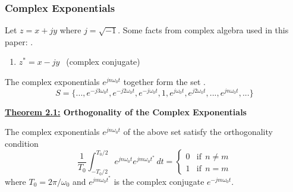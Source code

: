 \documentclass[10pt]{article}
\begin{document}
\subsubsection{Complex Exponentials}
Let $z = x + jy$ where $j = \sqrt{-1}$. Some facts from complex algebra used in this paper:  \cite{morrison1994fourier}.
\begin{enumerate}
    \item $z^{\ast} = x - jy\:\:$ (complex conjugate)
\end{enumerate}

\noindent
The complex exponentials $e^{jn\omega_0t}$ together form the set \cite{morrison1994fourier}.
\[ S = \{ ..., e^{-j3\omega_0t}, e^{-j2\omega_0t}, e^{-j\omega_0t}, 1, e^{j\omega_0t}, e^{j2\omega_0t}, ..., e^{jn\omega_0t}, ... \} \]

\vspace{4mm}
\noindent
\textbf{\underline{Theorem 2.1:} Orthogonality of the Complex Exponentials}

\vspace{2mm}


\noindent
The complex exponentials $e^{jn\omega_0t}$ of the above set satisfy the orthogonality condition
\[ \frac{1}{T_0}\int_{-T_0/2}^{T_0/2} e^{jn\omega_0t} e^{jm\omega_0t^{\ast}} \,dt = \begin{cases} 0 & \text{if} \:\: n \neq m \\ 1 & \text{if} \:\: n = m \end{cases}\] where $T_0 = 2\pi / \omega_0$ and $e^{jm\omega_0t^{\ast}}$ is the complex conjugate $e^{-jm\omega_0t}$.
\end{document}
